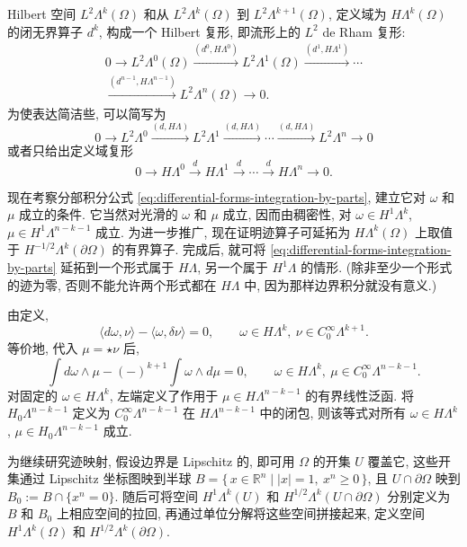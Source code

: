 Hilbert 空间 $L^2\Lambda^k(\Omega)$ 和从 $L^2\Lambda^k(\Omega)$ 到 $L^2\Lambda^{k+1}(\Omega)$, 定义域为 $H\Lambda^k(\Omega)$ 的闭无界算子 $d^k$, 构成一个 Hilbert 复形, 即流形上的 $L^2$ de Rham 复形:
\[
\begin{gathered}
0\to L^2\Lambda^0(\Omega)\xrightarrow{(d^0,H\Lambda^0)}L^2\Lambda^1(\Omega)\xrightarrow{(d^1,H\Lambda^1)}\cdots\\
\xrightarrow{(d^{n-1},H\Lambda^{n-1})}L^2\Lambda^n(\Omega)\to0.
\end{gathered}
\]
为使表达简洁些, 可以简写为
\begin{equation}\label{eq:l2-manifold-de-rham-complex}
0\to L^2\Lambda^0\xrightarrow{(d,H\Lambda)}L^2\Lambda^1\xrightarrow{(d,H\Lambda)}\cdots\xrightarrow{(d,H\Lambda)}L^2\Lambda^n\to0
\end{equation}
或者只给出定义域复形
\begin{equation}\label{eq:manifold-de-rham-domain-complex}
0\to H\Lambda^0\xrightarrow{d}H\Lambda^1\xrightarrow{d}\cdots\xrightarrow{d}H\Lambda^n\to0.
\end{equation}

现在考察分部积分公式 \eqref{eq:differential-forms-integration-by-parts}, 建立它对 $\omega$ 和 $\mu$ 成立的条件. 它当然对光滑的 $\omega$ 和 $\mu$ 成立, 因而由稠密性, 对 $\omega\in H^1\Lambda^k$, $\mu\in H^1\Lambda^{n-k-1}$ 成立. 为进一步推广, 现在证明迹算子可延拓为 $H\Lambda^k(\Omega)$ 上取值于 $H^{-1/2}\Lambda^k(\partial\Omega)$ 的有界算子. 完成后, 就可将 \eqref{eq:differential-forms-integration-by-parts} 延拓到一个形式属于 $H\Lambda$, 另一个属于 $H^1\Lambda$ 的情形. (除非至少一个形式的迹为零, 否则不能允许两个形式都在 $H\Lambda$ 中, 因为那样边界积分就没有意义.)

由定义,
\[
\langle d\omega,\nu\rangle-\langle\omega,\delta\nu\rangle=0,\qquad\omega\in H\Lambda^k,\ \nu\in C_0^\infty\Lambda^{k+1}.
\]
等价地, 代入 $\mu=\star\nu$ 后,
\[
\int d\omega\wedge\mu-(-)^{k+1}\int\omega\wedge d\mu=0,\qquad\omega\in H\Lambda^k,\ \mu\in C_0^\infty\Lambda^{n-k-1}.
\]
对固定的 $\omega\in H\Lambda^k$, 左端定义了作用于 $\mu\in H\Lambda^{n-k-1}$ 的有界线性泛函. 将 $ H_{0}\Lambda^{n-k-1}$ 定义为 $C_0^\infty\Lambda^{n-k-1}$ 在 $H\Lambda^{n-k-1}$ 中的闭包, 则该等式对所有 $\omega\in H\Lambda^k$, $\mu\in H_{0}\Lambda^{n-k-1}$ 成立.

为继续研究迹映射, 假设边界是 Lipschitz 的, 即可用 $\Omega$ 的开集 $U$ 覆盖它, 这些开集通过 Lipschitz 坐标图映到半球 $B=\{\,x\in\mathbb R^n\mid|x|=1,\ x^n\geq0\,\}$, 且 $U\cap\partial\Omega$ 映到 $B_0:=B\cap\{x^n=0\}$. 随后可将空间 $H^1\Lambda^k(U)$ 和 $H^{1/2}\Lambda^k(U\cap\partial\Omega)$ 分别定义为 $B$ 和 $B_0$ 上相应空间的拉回, 再通过单位分解将这些空间拼接起来, 定义空间 $H^1\Lambda^k(\Omega)$ 和 $H^{1/2}\Lambda^k(\partial\Omega)$.

